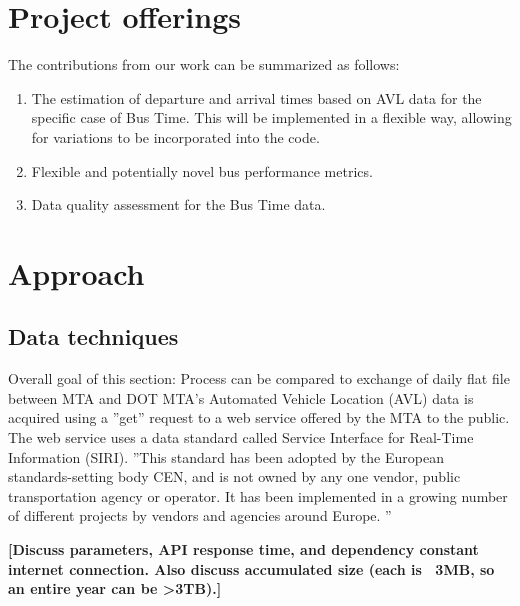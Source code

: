 \documentclass[12pt]{report}
\begin{document}
\section{Project offerings}

The contributions from our work can be summarized as follows:

\begin{enumerate}
\item The estimation of departure and arrival times based on AVL data for the specific case of Bus Time. This will be implemented in a flexible way, allowing for variations to be incorporated into the code.
\item Flexible and potentially novel bus performance metrics.
\item Data quality assessment for the Bus Time data.
\end{enumerate}


\section{Approach}

\subsection{Data techniques}

Overall goal of this section: Process can be compared to exchange of daily flat file between MTA and  DOT MTA's Automated Vehicle Location (AVL) data is acquired using a ''get'' request to a web service offered by the MTA to the public.  The web service uses a data standard called Service Interface for Real-Time Information (SIRI).  ''This standard has been adopted by the European standards-setting body CEN, and is not owned by any one vendor, public transportation agency or operator.  It has been implemented in a growing number of different projects by vendors and agencies around Europe. ''

\textbf{[Discuss parameters, API response time, and dependency constant internet connection.  Also discuss accumulated size (each is ~3MB, so an entire year can be >3TB).]}
\end{document}
